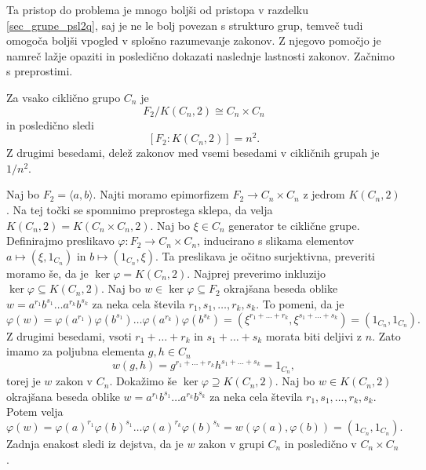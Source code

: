 Ta pristop do problema je mnogo boljši od pristopa v razdelku \ref{sec_grupe_psl2q}, saj je ne le bolj povezan s strukturo grup, temveč tudi omogoča boljši vpogled v splošno razumevanje zakonov.
Z njegovo pomočjo je namreč lažje opaziti in posledično dokazati naslednje lastnosti zakonov. Začnimo s preprostimi.
\begin{trditev}
\label{trd_lastnosti_zakonov_ciklicne}
 Za vsako ciklično grupo $C_n$ je \begin{equation*}
 F_2 / K(C_n, 2) \cong C_n \times C_n
 \end{equation*}  
 in posledično sledi \begin{equation*}
\left[ F_2 : K(C_n, 2) \right] = n^2.
 \end{equation*}  
Z drugimi besedami, delež zakonov med vsemi besedami v cikličnih grupah je $1 / n^2$.
\end{trditev}
\begin{dokaz}
Naj bo $F_2 = \langle a, b \rangle$.
Najti moramo epimorfizem $F_2 \to C_n \times C_n$ z jedrom $K(C_n ,2)$. Na tej točki se spomnimo preprostega sklepa, da velja $K(C_n, 2) = K(C_n \times C_n, 2)$. Naj bo $\xi \in C_n$ generator te ciklične grupe. Definirajmo preslikavo $\varphi: F_2 \to C_n \times C_n$,
inducirano s slikama elementov $a \mapsto (\xi, 1_{C_n})$ in $b \mapsto (1_{C_n}, \xi)$.
Ta preslikava je očitno surjektivna, preveriti moramo še, da je $\ker \varphi = K(C_n, 2)$. Najprej preverimo inkluzijo $\ker \varphi \subseteq K(C_n, 2)$.
Naj bo $w  \in \ker \varphi \subseteq  F_2$ okrajšana beseda oblike $w = a^{r_1} b^{s_1} \ldots a^{r_{k}} b^{s_k}$ za neka cela števila $r_1, s_1, \ldots , r_k , s_k$. To pomeni, da je \begin{equation*}
\varphi(w) = \varphi(a^{r_1}) \varphi(b^{s_1}) \ldots \varphi(a^{r_k}) \varphi(b^{s_k}) = \left( \xi^{r_1 + \ldots + r_k}, \xi^{s_1 + \ldots + s_k} \right) = \left( 1_{C_n} , 1_{C_n} \right).
\end{equation*}  
Z drugimi besedami, vsoti $r_1 + \ldots + r_k$ in $s_1 + \ldots + s_k$ morata biti deljivi z $n$. Zato imamo za poljubna elementa $g, h \in C_n$ \begin{equation*}
w(g, h) =  g^{r_1 + \ldots + r_k} h^{s_1 + \ldots + s_k} = 1_{C_n},
\end{equation*}
torej je $w$ zakon v $C_n$. Dokažimo še $\ker \varphi \supseteq K(C_n, 2)$. Naj bo $w \in K(C_n, 2)$ okrajšana beseda oblike $w = a^{r_1} b^{s_1} \ldots a^{r_{k}} b^{s_k}$ za neka cela števila $r_1, s_1, \ldots , r_k , s_k$.
Potem velja \begin{equation*}
    \varphi(w) = \varphi(a)^{r_1} \varphi(b)^{s_1} \ldots \varphi(a)^{r_k} \varphi(b)^{s_k} = w(\varphi(a), \varphi(b)) = (1_{C_n} , 1_{C_n}).
    \end{equation*}
    Zadnja enakost sledi iz dejstva, da je $w$ zakon v grupi $C_n$ in posledično v $C_n \times C_n$.
\end{dokaz}
